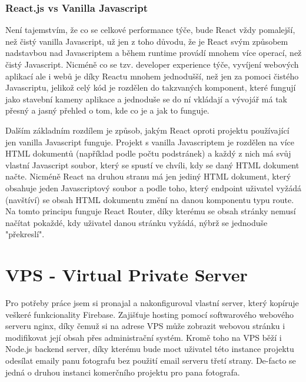 \documentclass[12pt,a4paper]{report}
\begin{document}
  \subsection{React.js vs Vanilla Javascript}
  Není tajemstvím, že co se celkové performance týče, bude React vždy pomalejší, než čistý vanilla Javascript, už jen 
  z toho důvodu, že je React svým způsobem nadstavbou nad Javascriptem a během runtime provádí mnohem více operací, než čistý Javascript.
  Nicméně co se tzv. developer experience týče, vyvíjení webových aplikací ale i webů je díky Reactu mnohem jednodušší, než jen
  za pomoci čistého Javascriptu, jelikož celý kód je rozdělen do takzvaných komponent, které fungují jako stavební kameny aplikace a jednoduše se 
  do ní vkládají a vývojář má tak přesný a jasný přehled o tom, kde co je a jak to funguje. 

  Dalším základním rozdílem je způsob, jakým React oproti projektu používající jen vanilla Javascript funguje.
  Projekt s vanilla Javascriptem je rozdělen na více HTML dokumentů (například podle počtu podstránek) a každý z nich má svůj vlastní 
  Javascript soubor, který se spustí ve chvíli, kdy se daný HTML dokument načte.
  Nicméně React na druhou stranu má jen jediný HTML dokument, který obsahuje jeden Javascriptový soubor a podle toho,
  který endpoint uživatel vyžádá (navštíví) se obsah HTML dokumentu změní na danou komponentu typu route. Na tomto principu funguje React Router,
  díky kterému se obsah stránky nemusí načítat pokaždé, kdy uživatel danou stránku vyžádá, nýbrž se jednoduše "překreslí".
 
  \chapter{VPS - Virtual Private Server}
   Pro potřeby práce jsem si pronajal a nakonfiguroval vlastní server, který kopíruje veškeré funkcionality
   Firebase. Zajišťuje hosting pomocí softwarového webového serveru nginx, díky čemuž si na adrese VPS může
   zobrazit webovou stránku i modifikovat její obsah přes administrační systém. Kromě toho na VPS běží i Node.js backend server,
   díky kterému bude moct uživatel této instance projektu odesílat emaily panu fotografu bez použití email serveru třetí strany. 
   De-facto se jedná o druhou instanci komerčního projektu pro pana fotografa. 
\end{document}
